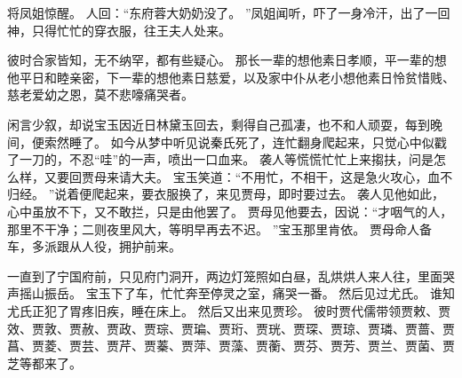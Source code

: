 将凤姐惊醒。
人回：“东府蓉大奶奶没了。
”凤姐闻听，吓了一身冷汗，出了一回神，只得忙忙的穿衣服，往王夫人处来。
\par
彼时合家皆知，无不纳罕，都有些疑心。
那长一辈的想他素日孝顺，平一辈的想他平日和睦亲密，下一辈的想他素日慈爱，以及家中仆从老小想他素日怜贫惜贱、慈老爱幼之恩，莫不悲嚎痛哭者。
\par
闲言少叙，却说宝玉因近日林黛玉回去，剩得自己孤凄，也不和人顽耍，每到晚间，便索然睡了。
如今从梦中听见说秦氏死了，连忙翻身爬起来，只觉心中似戳了一刀的，不忍“哇”的一声，喷出一口血来。
袭人等慌慌忙忙上来搊扶，问是怎么样，又要回贾母来请大夫。
宝玉笑道：“不用忙，不相干，这是急火攻心，血不归经。
”说着便爬起来，要衣服换了，来见贾母，即时要过去。
袭人见他如此，心中虽放不下，又不敢拦，只是由他罢了。
贾母见他要去，因说：“才咽气的人，那里不干净；二则夜里风大，等明早再去不迟。
”宝玉那里肯依。
贾母命人备车，多派跟从人役，拥护前来。
\par
一直到了宁国府前，只见府门洞开，两边灯笼照如白昼，乱烘烘人来人往，里面哭声摇山振岳。
宝玉下了车，忙忙奔至停灵之室，痛哭一番。
然后见过尤氏。
谁知尤氏正犯了胃疼旧疾，睡在床上。
然后又出来见贾珍。
彼时贾代儒带领贾敕、贾效、贾敦、贾赦、贾政、贾琮、贾㻞、贾珩、贾珖、贾琛、贾琼、贾璘、贾蔷、贾菖、贾菱、贾芸、贾芹、贾蓁、贾萍、贾藻、贾蘅、贾芬、贾芳、贾兰、贾菌、贾芝等都来了。
